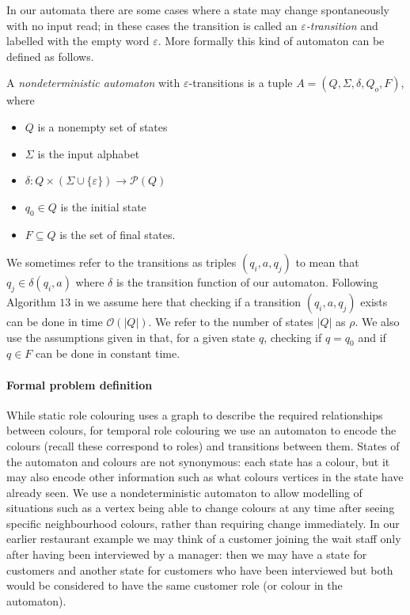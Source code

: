 \documentclass[runningheads]{llncs}
\begin{document}
In our automata there are some cases where a state may change spontaneously with no input read; in these cases the transition is called an \textit{$\varepsilon$-transition} and labelled with the empty word $\varepsilon$.
More formally this kind of automaton can be defined as follows.
\begin{definition}
    A \emph{nondeterministic automaton} with $\varepsilon$-transitions is a tuple $A=(Q,\Sigma,\delta,Q_o,F)$, where
\begin{itemize}
\item $Q$ is a nonempty set of states
\item $\Sigma$ is the input alphabet
   \item $\delta:Q \times (\Sigma \cup \{\varepsilon\}) \rightarrow \mathcal{P}(Q)$
\item $q_0 \in Q$ is the initial state
\item $F \subseteq Q$ is the set of final states.
\end{itemize}
\end{definition}
We sometimes refer to the transitions as triples $(q_i,a,q_j)$ to mean that $q_j \in \delta(q_i,a)$ where $\delta$ is the transition function of our automaton. 
Following Algorithm $13$ in \cite{esparza2023automata} we assume here that checking if a transition $(q_i,a,q_j)$ exists can be done in time $\mathcal{O}(|Q|)$. We refer to the number of states $|Q|$ as $\rho$. We also use the assumptions given in \cite{esparza2023automata} that, for a given state $q$, checking if $q=q_0$ and if $q\in F$ can be done in constant time.

\paragraph{Formal problem definition} While static role colouring uses a graph to describe the required relationships between colours, for temporal role colouring we use an automaton to encode the colours (recall these correspond to roles) and transitions between them. States of the automaton and colours are not synonymous: each state has a colour, but it may also encode other information such as what colours vertices in the state have already seen.
We use a nondeterministic automaton to allow modelling of situations such as a vertex being able to change colours at any time after seeing specific neighbourhood colours, rather than requiring change immediately.  
In our earlier restaurant example we may think of a customer joining the wait staff only after having been interviewed by a manager: then we may have a state for customers and another state for customers who have been interviewed but both would be considered to have the same customer role (or colour in the automaton).
\end{document}
